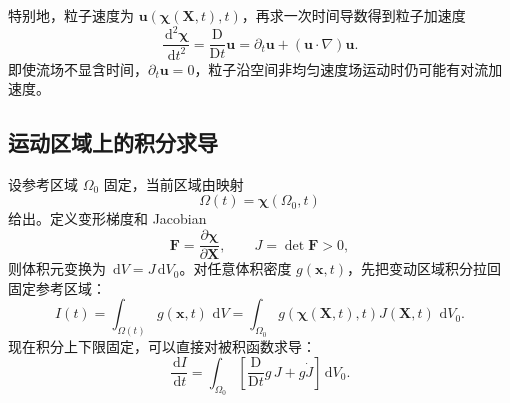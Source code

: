 \documentclass[cn,hazy,blue,11pt,normal]{elegantnote}
\numberwithin{equation}{section}
\newcommand{\dd}{\,\mathrm d}
\newcommand{\Dt}{\frac{\mathrm D}{\mathrm Dt}}
\newcommand{\vct}[1]{\bm{#1}}
\newcommand{\ten}[1]{\bm{#1}}
\begin{document}
特别地，粒子速度为 $\vct u(\vct\chi(\vct X,t),t)$，再求一次时间导数得到粒子加速度
\begin{equation}
 \boxed{\frac{\dd^2\vct\chi}{\dd t^2}
 =\Dt\vct u
 =\partial_t\vct u+(\vct u\cdot\nabla)\vct u.} \label{eq:particle-acceleration}
\end{equation}
即使流场不显含时间，$\partial_t\vct u=0$，粒子沿空间非均匀速度场运动时仍可能有对流加速度。

\subsection{运动区域上的积分求导}

设参考区域 $\Omega_0$ 固定，当前区域由映射
\begin{equation}
 \Omega(t)=\vct\chi(\Omega_0,t)
\end{equation}
给出。定义变形梯度和 Jacobian
\begin{equation}
 \ten F=\frac{\partial\vct\chi}{\partial\vct X},
 \qquad J=\det\ten F>0,
\end{equation}
则体积元变换为 $\dd V=J\dd V_0$。对任意体积密度 $g(\vct x,t)$，先把变动区域积分拉回固定参考区域：
\begin{equation}
 I(t)=\int_{\Omega(t)}g(\vct x,t)\,\dd V
 =\int_{\Omega_0}g(\vct\chi(\vct X,t),t)J(\vct X,t)\,\dd V_0. \label{eq:pullback-integral}
\end{equation}
现在积分上下限固定，可以直接对被积函数求导：
\begin{equation}
 \frac{\dd I}{\dd t}
 =\int_{\Omega_0}
 \left[\Dt g\,J+g\dot J\right]\dd V_0. \label{eq:transport-before-J}
\end{equation}
\end{document}
